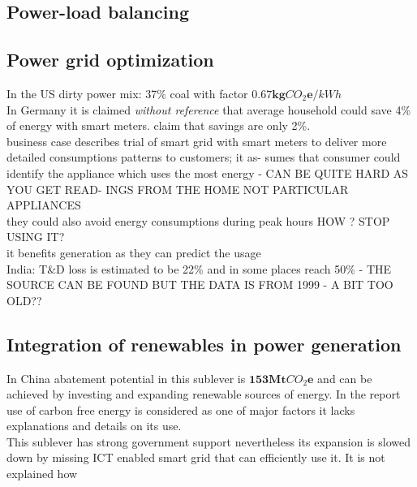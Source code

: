 \documentclass[11pt, twocolumn]{article}
\begin{document}
\subsection{Power-load balancing}






\newpage
\subsection{Power grid optimization}

In the US dirty power mix: 37\% coal with factor $\mathbf{0.67} \mathbf{kg}CO_2\mathbf{e} / kWh$\\

In Germany it is claimed \emph{without reference} that average household could save 4\% of energy with smart meters. \citep{bbc:smartmeters} claim that savings are only 2\%.\\
business case describes trial of smart grid with smart meters to deliver more detailed consumptions patterns to customers; it as- sumes that consumer could identify the appliance which uses the most energy - CAN BE QUITE HARD AS YOU GET READ- INGS FROM THE HOME NOT PARTICULAR APPLIANCES\\
they could also avoid energy consumptions during peak hours HOW ? STOP USING IT?\\
it benefits generation as they can predict the usage\\

India: T\&D loss is estimated to be 22\% and in some places reach 50\% - THE SOURCE CAN BE FOUND BUT THE DATA IS FROM 1999 - A BIT TOO OLD??\\



\subsection{Integration of renewables in power generation}


In China abatement potential in this sublever is $\mathbf{153} \mathbf{Mt}CO_2\mathbf{e}$ and can be achieved by investing and expanding renewable sources of energy. In the report use of carbon free energy is considered as one of major factors it lacks explanations and details on its use.\\
This sublever has strong government support nevertheless its expansion is slowed down by missing ICT enabled smart grid that can efficiently use it. It is not explained how 
\newpage
\end{document}
